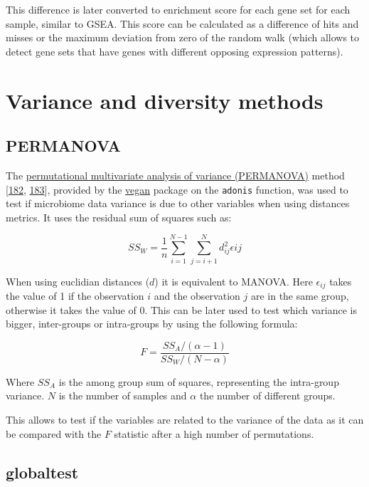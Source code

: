\documentclass[
  12pt,
  a4paper,
  twoside,
  openright]{book}
\begin{document}
This difference is later converted to enrichment score for each gene set for each sample, similar to GSEA.
This score can be calculated as a difference of hits and misses or the maximum deviation from zero of the random walk (which allows to detect gene sets that have genes with different opposing expression patterns).

\hypertarget{variance}{%
\section{Variance and diversity methods}\label{variance}}

\hypertarget{permanova}{%
\subsection{PERMANOVA}\label{permanova}}

The \protect\hyperlink{acronyms_PERMANOVA}{permutational multivariate analysis of variance (PERMANOVA)} method {[}\protect\hyperlink{ref-anderson2001}{182}, \protect\hyperlink{ref-warton2012}{183}{]}, provided by the \href{https://cran.r-project.org/package=vegan}{vegan} package on the \texttt{adonis} function, was used to test if microbiome data variance is due to other variables when using distances metrics.
It uses the residual sum of squares such as:

\[
SS_W = \frac{1}{n} \sum_{i=1}^{N-1}\sum_{j=i+1}^N d_{ij}^2\epsilon{ij} 
\]

When using euclidian distances (\(d\)) it is equivalent to MANOVA.
Here \(\epsilon_{ij}\) takes the value of 1 if the observation \(i\) and the observation \(j\) are in the same group, otherwise it takes the value of 0.
This can be later used to test which variance is bigger, inter-groups or intra-groups by using the following formula:

\[
F = \dfrac{SS_A/(\alpha -1)}{SS_W/(N-\alpha)}
\]

Where \(SS_A\) is the among group sum of squares, representing the intra-group variance.
\(N\) is the number of samples and \(\alpha\) the number of different groups.

This allows to test if the variables are related to the variance of the data as it can be compared with the \(F\) statistic after a high number of permutations.

\hypertarget{globaltest}{%
\subsection{globaltest}\label{globaltest}}
\end{document}
